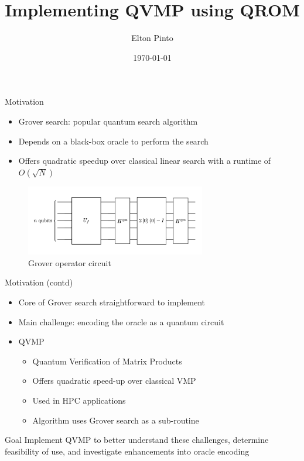 \documentclass[10pt]{beamer}
\title{Implementing QVMP using QROM}
\author{Elton Pinto}
\date{\today}
\begin{document}
\begin{frame}[plain]
\titlepage
\end{frame}


\begin{frame}{Motivation}
  \begin{itemize}
    \item Grover search: popular quantum search algorithm
    \item Depends on a black-box oracle to perform the search
    \item Offers quadratic speedup over classical linear search with a
      runtime of $O(\sqrt{N})$
  \end{itemize}
  \begin{figure}
    \centering
    \includegraphics[width=0.7\textwidth]{assets/grover_operator.png}
    \caption{Grover operator circuit}
    \label{fig:grover_operator_circuit}
  \end{figure}
\end{frame}


\begin{frame}{Motivation (contd)}
  \begin{itemize}
    \item Core of Grover search straightforward to implement
    \item {
      Main challenge: encoding the oracle as a quantum circuit
    }
    \item {
      QVMP
      \begin{itemize}
        \item Quantum Verification of Matrix Products
        \item Offers quadratic speed-up over classical VMP
        \item Used in HPC applications
        \item Algorithm uses Grover search as a sub-routine
      \end{itemize}
    }
  \end{itemize}

  \begin{alertblock}{Goal}
    Implement QVMP to better understand these challenges, determine feasibility
    of use, and investigate enhancements into oracle encoding
  \end{alertblock}
\end{frame}
\end{document}
